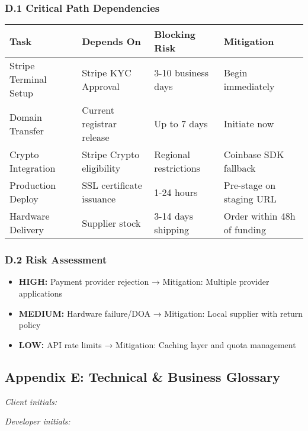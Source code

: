 \documentclass[11pt, a4paper]{article}
\begin{document}
\subsubsection*{D.1 Critical Path Dependencies}
\begin{center}
\small
\begin{tabular}{|l|l|p{5cm}|l|}
\hline
\rowcolor{lightgray}
\textbf{Task} & \textbf{Depends On} & \textbf{Blocking Risk} & \textbf{Mitigation}\\
\hline
Stripe Terminal Setup & Stripe KYC Approval & 3-10 business days & Begin immediately\\
\hline
Domain Transfer & Current registrar release & Up to 7 days & Initiate now\\
\hline
Crypto Integration & Stripe Crypto eligibility & Regional restrictions & Coinbase SDK fallback\\
\hline
Production Deploy & SSL certificate issuance & 1-24 hours & Pre-stage on staging URL\\
\hline
Hardware Delivery & Supplier stock & 3-14 days shipping & Order within 48h of funding\\
\hline
\end{tabular}
\end{center}

\subsubsection*{D.2 Risk Assessment}
\begin{itemize}[leftmargin=*]
\item \textbf{HIGH:} Payment provider rejection → Mitigation: Multiple provider applications
\item \textbf{MEDIUM:} Hardware failure/DOA → Mitigation: Local supplier with return policy
\item \textbf{LOW:} API rate limits → Mitigation: Caching layer and quota management
\end{itemize}

\subsection*{Appendix E: Technical \& Business Glossary}
\label{appendix:glossary}
\noindent
\begin{minipage}[t]{0.45\textwidth}
\textit{Client initials: }\TextField[name=init_client_E,width=1.6cm,bordercolor={0.7 0.7 0.7}]{}
\end{minipage}%
\hfill%
\begin{minipage}[t]{0.45\textwidth}
\raggedleft
\textit{Developer initials: }\TextField[name=init_dev_E,width=1.6cm,bordercolor={0.7 0.7 0.7}]{}
\end{minipage}
\vspace{0.3cm}
\end{document}
